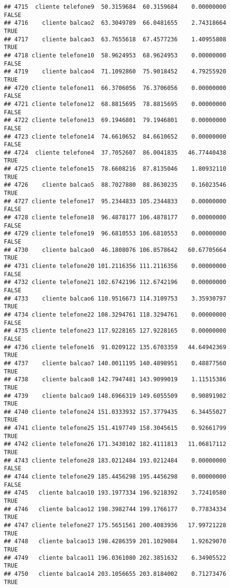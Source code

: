 \documentclass[
]{article}
\begin{document}
\begin{verbatim}
## 4715  cliente telefone9  50.3159684  60.3159684    0.00000000    FALSE
## 4716    cliente balcao2  63.3049789  66.0481655    2.74318664     TRUE
## 4717    cliente balcao3  63.7655618  67.4577236    1.40955808     TRUE
## 4718 cliente telefone10  58.9624953  68.9624953    0.00000000    FALSE
## 4719    cliente balcao4  71.1092860  75.9018452    4.79255920     TRUE
## 4720 cliente telefone11  66.3706056  76.3706056    0.00000000    FALSE
## 4721 cliente telefone12  68.8815695  78.8815695    0.00000000    FALSE
## 4722 cliente telefone13  69.1946801  79.1946801    0.00000000    FALSE
## 4723 cliente telefone14  74.6610652  84.6610652    0.00000000    FALSE
## 4724  cliente telefone4  37.7052607  86.0041835   46.77440438     TRUE
## 4725 cliente telefone15  78.6608216  87.8135046    1.80932110     TRUE
## 4726    cliente balcao5  88.7027880  88.8630235    0.16023546     TRUE
## 4727 cliente telefone17  95.2344833 105.2344833    0.00000000    FALSE
## 4728 cliente telefone18  96.4878177 106.4878177    0.00000000    FALSE
## 4729 cliente telefone19  96.6810553 106.6810553    0.00000000    FALSE
## 4730    cliente balcao0  46.1808076 106.8578642   60.67705664     TRUE
## 4731 cliente telefone20 101.2116356 111.2116356    0.00000000    FALSE
## 4732 cliente telefone21 102.6742196 112.6742196    0.00000000    FALSE
## 4733    cliente balcao6 110.9516673 114.3109753    3.35930797     TRUE
## 4734 cliente telefone22 108.3294761 118.3294761    0.00000000    FALSE
## 4735 cliente telefone23 117.9228165 127.9228165    0.00000000    FALSE
## 4736 cliente telefone16  91.0209122 135.6703359   44.64942369     TRUE
## 4737    cliente balcao7 140.0011195 140.4898951    0.48877560     TRUE
## 4738    cliente balcao8 142.7947481 143.9099019    1.11515386     TRUE
## 4739    cliente balcao9 148.6966319 149.6055509    0.90891902     TRUE
## 4740 cliente telefone24 151.0333932 157.3779435    6.34455027     TRUE
## 4741 cliente telefone25 151.4197749 158.3045615    0.92661799     TRUE
## 4742 cliente telefone26 171.3430102 182.4111813   11.06817112     TRUE
## 4743 cliente telefone28 183.0212484 193.0212484    0.00000000    FALSE
## 4744 cliente telefone29 185.4456298 195.4456298    0.00000000    FALSE
## 4745   cliente balcao10 193.1977334 196.9218392    3.72410580     TRUE
## 4746   cliente balcao12 198.3982744 199.1766177    0.77834334     TRUE
## 4747 cliente telefone27 175.5651561 200.4083936   17.99721228     TRUE
## 4748   cliente balcao13 198.4286359 201.1029084    1.92629070     TRUE
## 4749   cliente balcao11 196.0361080 202.3851632    6.34905522     TRUE
## 4750   cliente balcao14 203.1056655 203.8184002    0.71273476     TRUE

\end{verbatim}
\end{document}
